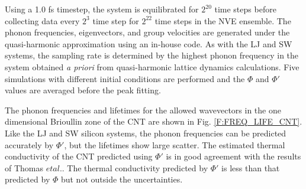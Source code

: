 \documentclass[letterpaper,12pt]{article}
\begin{document}
Using a 1.0 fs timestep, the system is equilibrated for $2^{20}$ time steps before collecting data every $2^3$ time step for $2^{22}$ time steps in the NVE ensemble.\cite{mcquarrie2000} The phonon frequencies, eigenvectors, and group velocities are generated under the quasi-harmonic approximation using an in-house code.\cite{thomas2010c} As with the LJ and SW systems, the sampling rate is determined by the highest phonon frequency in the system obtained {\em a priori} from quasi-harmonic lattice dynamics calculations. Five simulations with different initial conditions are performed and the $\Phi$ and $\Phi'$ values are averaged before the peak fitting.

The phonon frequencies and lifetimes for the allowed wavevectors in the one dimensional Brioullin zone of the CNT are shown in Fig. \ref{F:FREQ_LIFE_CNT}. Like the LJ and SW silicon systems, the phonon frequencies can be predicted accurately by $\Phi'$, but the lifetimes show large scatter. The estimated thermal conductivity of the CNT predicted using $\Phi'$ is in good agreement with the results of Thomas $et al.$.\cite{thomas2010c} The thermal conductivity predicted by $\Phi'$ is less than that predicted by $\Phi$ but not outside the uncertainties.


\end{document}
